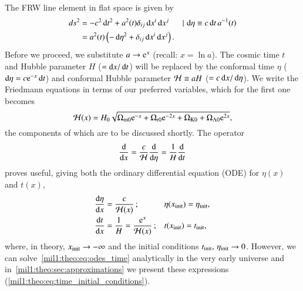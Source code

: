 


The FRW line element in flat space is given by
\begin{equation}\label{mil1:theo:eq:FRW}
    \begin{split}
        d s^2 &= -c^2\diff t^2 + a^2(t) \delta_{ij} \diff x^i \diff x^j && |\, \diff \eta \equiv c\diff t\, a^{-1}(t) \\%
                &= a^2(t) \left( -\diff \eta^2 + \delta_{ij} \diff x^i \diff x^j \right).
    \end{split}
\end{equation}
Before we proceed, we substitute $a\to \mathrm{e}^x$ (recall: $x=\ln{a}$). The cosmic time $t$ and Hubble parameter $H$ ($=\mathop{}\!\mathrm{d} x/\mathop{}\!\mathrm{d} t$) will be replaced by the conformal time $\eta$ ($\mathop{}\!\mathrm{d} \eta = c\mathrm{e}^{-x}\mathop{}\!\mathrm{d} t$) and conformal Hubble parameter $\mathcal{H}\equiv aH$ ($=c\mathop{}\!\mathrm{d} x/\mathop{}\!\mathrm{d} \eta$). We write the Friedmann equations in terms of our preferred variables, which for the first one becomes
\begin{equation}\label{mil1:theo:eq:Hp_of_x}
    \mathcal{H}(x) = H_0 \sqrt{\Omega_{\mathrm{m}0} \mathrm{e}^{-x} + \Omega_{\mathrm{r}0} \mathrm{e}^{-2x}  + \Omega_{\mathrm{K}0} + \Omega_{\mathrm{\Lambda}0} \mathrm{e}^{2x}},
\end{equation}
the components of which are to be discussed shortly. The operator 
\begin{equation}
    \dv{}{x} = \frac{c}{\mathcal{H}} \dv{}{\eta} = \frac{1}{H} \dv{}{t}
\end{equation}
proves useful, giving both the ordinary differential equation (ODE) for $\eta(x)$ and $t(x)$,
\begin{subequations}\label{mil1:theo:eq:odes_time}
    \begin{align}
        \dv{\eta}{x} &= \frac{c}{\mathcal{H}(x)}\,; &&  \eta(x_\mathrm{init}) = \eta_\mathrm{init} ,\label{mi1:theo:eq:ode_eta_of_x}\\
        \dv{t}{x} &= \frac{1}{H} = \frac{\mathrm{e}^x}{\mathcal{H}(x)}\,; && t(x_\mathrm{init}) = t_\mathrm{init},\label{mi1:theo:eq:ode_t_of_x}
    \end{align}
\end{subequations}
where, in theory, $x_\mathrm{init}\to -\infty$ and the initial conditions $t_\mathrm{init},\, \eta_\mathrm{init} \to 0$. However, we can solve~\cref{mil1:theo:eq:odes_time} analytically in the very early universe and in~\cref{mil1:theo:sec:approximations} we present these expressions (\cref{mil1:theo:eq:time_initial_conditions}). 

